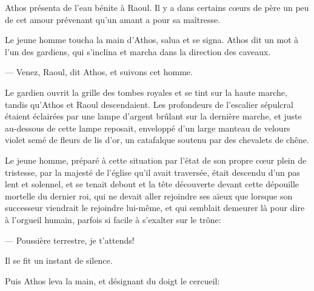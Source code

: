 Athos présenta de l'eau bénite à Raoul. Il y a dans certains cœurs de père un peu de cet amour prévenant qu'un amant a pour sa maîtresse.

Le jeune homme toucha la main d'Athos, salua et se signa. Athos dit un mot à l'un des gardiens, qui s'inclina et marcha dans la direction des caveaux.

— Venez, Raoul, dit Athos, et suivons cet homme.

Le gardien ouvrit la grille des tombes royales et se tint sur la haute marche, tandis qu'Athos et Raoul descendaient. Les profondeurs de l'escalier sépulcral étaient éclairées par une lampe d'argent brûlant sur la dernière marche, et juste au-dessous de cette lampe reposait, enveloppé d'un large manteau de velours violet semé de fleurs de lis d'or, un catafalque soutenu par des chevalets de chêne.

Le jeune homme, préparé à cette situation par l'état de son propre cœur plein de tristesse, par la majesté de l'église qu'il avait traversée, était descendu d'un pas lent et solennel, et se tenait debout et la tête découverte devant cette dépouille mortelle du dernier roi, qui ne devait aller rejoindre ses aïeux que lorsque son successeur viendrait le rejoindre lui-même, et qui semblait demeurer là pour dire à l'orgueil humain, parfois si facile à s'exalter sur le trône:

— Poussière terrestre, je t'attends!

Il se fit un instant de silence.

Puis Athos leva la main, et désignant du doigt le cercueil:


